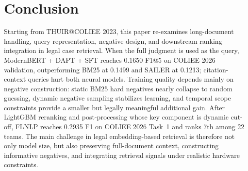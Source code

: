 \section{Conclusion}

Starting from THUIR@COLIEE 2023, this paper re-examines long-document handling, query representation, negative design, and downstream ranking integration in legal case retrieval. When the full judgment is used as the query, ModernBERT + DAPT + SFT reaches 0.1650 F1@5 on COLIEE 2026 validation, outperforming BM25 at 0.1499 and SAILER at 0.1213; citation-context queries hurt both neural models. Training quality depends mainly on negative construction: static BM25 hard negatives nearly collapse to random guessing, dynamic negative sampling stabilizes learning, and temporal scope constraints provide a smaller but legally meaningful additional gain. After LightGBM reranking and post-processing whose key component is dynamic cut-off, FLNLP reaches 0.2935 F1 on COLIEE 2026 Task~1 and ranks 7th among 22 teams. The main challenge in legal embedding-based retrieval is therefore not only model size, but also preserving full-document context, constructing informative negatives, and integrating retrieval signals under realistic hardware constraints.
